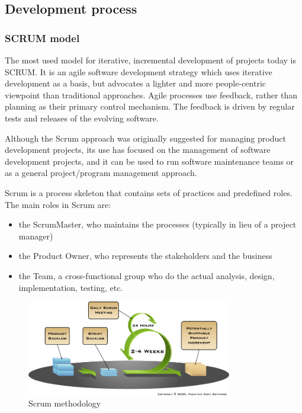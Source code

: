 \subsection{Development process}

\subsubsection{SCRUM model}
	
The most used model for iterative, incremental development of projects today
is SCRUM. It is an agile software development strategy which uses iterative
development as a basis, but advocates a lighter and more people-centric viewpoint
than traditional approaches. Agile processes use feedback, rather than planning
as their primary control mechanism. The feedback is driven by regular tests and
releases of the evolving software. \cite{wiki:development-process}\newline
	
Although the Scrum approach was originally suggested for managing product development
projects, its use has focused on the management of software development projects,
and it can be used to run software maintenance teams or as a general
project/program management approach.\newline
	
Scrum is a process skeleton that contains sets of practices and predefined roles.
The main roles in Scrum are:	
\begin{itemize}
	\item the ScrumMaster, who maintains the processes (typically in lieu of a project manager)
	\item the Product Owner, who represents the stakeholders and the business
	\item the Team, a cross-functional group who do the actual analysis, design, implementation, testing, etc.
\end{itemize}

\begin{figure}[htb]
	\centering
	\includegraphics[width=0.8\textwidth]{prestudy/development_process/scrum.png}
	\caption{Scrum methodology\cite{targetprocess:scrum}}
	\label{fig:scrum-methology}
\end{figure}


